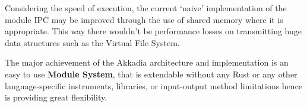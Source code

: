 Considering the speed of execution, the current `naive' implementation of the module IPC may be improved through
the use of shared memory where it is appropriate. This way there wouldn't be performance losses on transmitting huge data structures
such as the Virtual File System.

The major achievement of the Akkadia architecture and implementation is an easy to use \textbf{Module System},
that is extendable without any Rust or any other language-specific instruments, libraries, or input-output method limitations
hence is providing great flexibility.